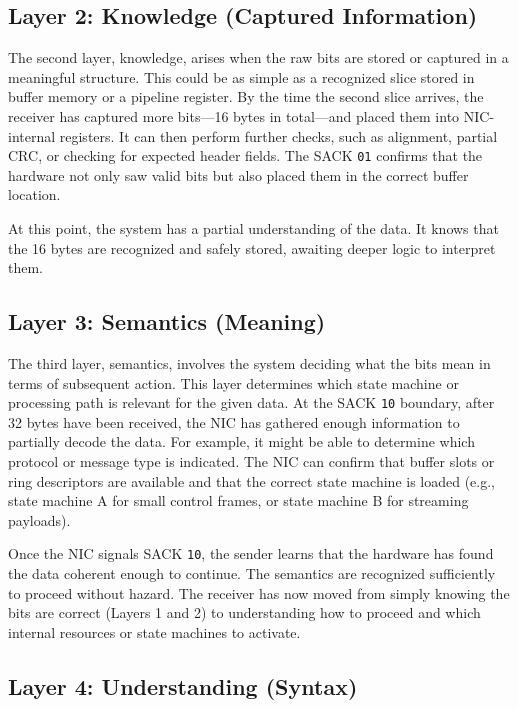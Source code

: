 \documentclass[../HFT-main.tex]{subfiles}
\begin{document}
\subsection*{Layer 2: Knowledge (Captured Information)}

The second layer, knowledge, arises when the raw bits are stored or captured in a meaningful structure. This could be as simple as a recognized slice stored in buffer memory or a pipeline register. By the time the second slice arrives, the receiver has captured more bits—16 bytes in total—and placed them into NIC-internal registers. It can then perform further checks, such as alignment, partial CRC, or checking for expected header fields. The SACK \texttt{01} confirms that the hardware not only saw valid bits but also placed them in the correct buffer location.

At this point, the system has a partial understanding of the data. It knows that the 16 bytes are recognized and safely stored, awaiting deeper logic to interpret them.

\subsection*{Layer 3: Semantics (Meaning)}

The third layer, semantics, involves the system deciding what the bits mean in terms of subsequent action. This layer determines which state machine or processing path is relevant for the given data. At the SACK \texttt{10} boundary, after 32 bytes have been received, the NIC has gathered enough information to partially decode the data. For example, it might be able to determine which protocol or message type is indicated. The NIC can confirm that buffer slots or ring descriptors are available and that the correct state machine is loaded (e.g., state machine A for small control frames, or state machine B for streaming payloads).

Once the NIC signals SACK \texttt{10}, the sender learns that the hardware has found the data coherent enough to continue. The semantics are recognized sufficiently to proceed without hazard. The receiver has now moved from simply knowing the bits are correct (Layers 1 and 2) to understanding how to proceed and which internal resources or state machines to activate.

\subsection*{Layer 4: Understanding (Syntax)}
\end{document}
